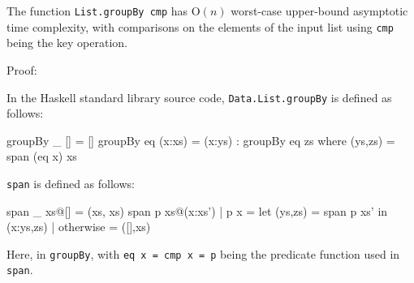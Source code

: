 \documentclass[../main.tex]{subfiles}
\begin{document}


\begin{proposition}
	The function \texttt{List.groupBy cmp} has O$(n)$ worst-case upper-bound asymptotic time complexity, with comparisons on the elements of the input list using \texttt{cmp} being the key operation.
\end{proposition}

Proof:

In the Haskell standard library source code, \texttt{Data.List.groupBy} is defined as follows\cite{hstdlib}:

\begin{code}
groupBy _  []           =  []
groupBy eq (x:xs)       =  (x:ys) : groupBy eq zs
where (ys,zs) = span (eq x) xs
\end{code}

\texttt{span} is defined as follows\cite{hstdlib}:

\begin{code}
span _ xs@[]            =  (xs, xs)
span p xs@(x:xs')
| p x          =  let (ys,zs) = span p xs' in (x:ys,zs)
| otherwise    =  ([],xs)
\end{code}





Here,  in \texttt{groupBy}, with \texttt{eq x = cmp x = p} being the predicate function used in \texttt{span}. %
\end{document}
